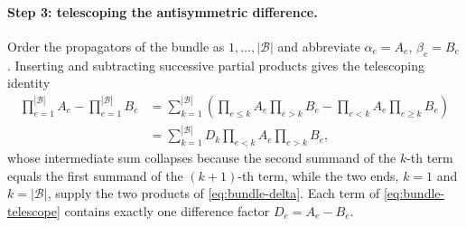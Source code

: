 \documentclass[11pt,a4paper]{article}
\numberwithin{table}{section}
\newcommand{\cB}{\mathcal B}
\begin{document}
\paragraph{Step 3: telescoping the antisymmetric difference.}
Order the propagators of the bundle as $1,\dots,|\cB|$ and abbreviate $\alpha_e=A_e$, $\beta_e=B_e$. Inserting
and subtracting successive partial products gives the telescoping identity
\begin{equation}
\begin{split}
  \prod_{e=1}^{|\cB|}A_e-\prod_{e=1}^{|\cB|}B_e
  &=\sum_{k=1}^{|\cB|}\left(\prod_{e\leq k}A_e\prod_{e>k}B_e
  -\prod_{e< k}A_e\prod_{e\geq k}B_e\right)\\
  &=\sum_{k=1}^{|\cB|}D_k\prod_{e<k}A_e\prod_{e>k}B_e ,
\end{split}
  \label{eq:bundle-telescope}
\end{equation}
whose intermediate sum collapses because the second summand of the $k$-th term equals the first
summand of the $(k{+}1)$-th term, while the two ends, $k=1$ and $k=|\cB|$, supply the two
products of \eqref{eq:bundle-delta}. Each term of \eqref{eq:bundle-telescope} contains exactly one
difference factor $D_e=A_e-B_e$.
\end{document}
